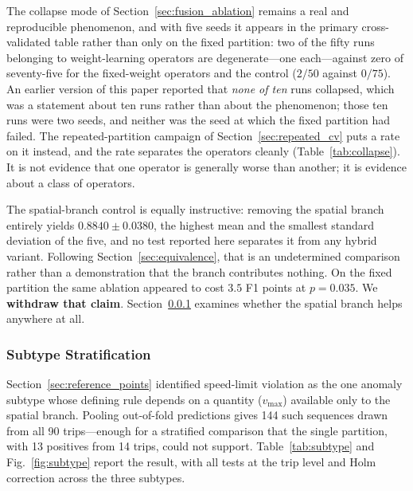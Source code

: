 \documentclass[journal]{IEEEtran}
\begin{document}
The collapse mode of Section~\ref{sec:fusion_ablation} remains a real and reproducible phenomenon, and with five seeds it appears in the primary cross-validated table rather than only on the fixed partition: two of the fifty runs belonging to weight-learning operators are degenerate---one each---against zero of seventy-five for the fixed-weight operators and the control ($2/50$ against $0/75$). An earlier version of this paper reported that \emph{none of ten} runs collapsed, which was a statement about ten runs rather than about the phenomenon; those ten runs were two seeds, and neither was the seed at which the fixed partition had failed. The repeated-partition campaign of Section~\ref{sec:repeated_cv} puts a rate on it instead, and the rate separates the operators cleanly (Table~\ref{tab:collapse}). It is not evidence that one operator is generally worse than another; it is evidence about a class of operators.

The spatial-branch control is equally instructive: removing the spatial branch entirely yields $0.8840 \pm 0.0380$, the highest mean and the smallest standard deviation of the five, and no test reported here separates it from any hybrid variant. Following Section~\ref{sec:equivalence}, that is an undetermined comparison rather than a demonstration that the branch contributes nothing. On the fixed partition the same ablation appeared to cost $3.5$ F1 points
at $p = 0.035$.  %
We \textbf{withdraw that claim}. Section~\ref{sec:subtype} examines whether the spatial branch helps anywhere at all.

\subsubsection{Subtype Stratification}
\label{sec:subtype}
Section~\ref{sec:reference_points} identified speed-limit violation as the one anomaly subtype whose defining rule depends on a quantity ($v_{\max}$) available only to the spatial branch. Pooling out-of-fold predictions gives 144 such sequences drawn from all 90 trips---enough for a stratified comparison that the single partition, with 13 positives from 14 trips, could not support. Table~\ref{tab:subtype} and Fig.~\ref{fig:subtype} report the result, with all tests at the trip level and Holm correction across the three subtypes.
\end{document}
